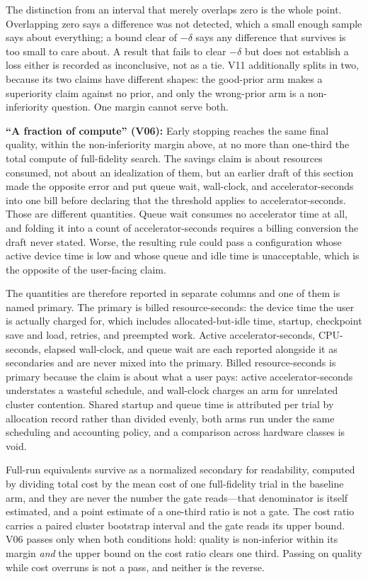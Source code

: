 The distinction from an interval that merely overlaps zero is the whole
point. Overlapping zero says a difference was not detected, which a
small enough sample says about everything; a bound clear of $-\delta$
says any difference that survives is too small to care about. A result
that fails to clear $-\delta$ but does not establish a loss either is
recorded as inconclusive, not as a tie. V11 additionally splits in two,
because its two claims have different shapes: the good-prior arm makes
a superiority claim against no prior, and only the wrong-prior arm is a
non-inferiority question. One margin cannot serve both.

\textbf{``A fraction of compute'' (V06):} Early stopping reaches the
same final quality, within the non-inferiority margin above, at no
more than one-third the total compute of full-fidelity search.
The savings claim is about resources consumed, not about an
idealization of them, but an earlier draft of this section made the
opposite error and put queue wait, wall-clock, and accelerator-seconds
into one bill before declaring that the threshold applies to
accelerator-seconds. Those are different quantities. Queue wait
consumes no accelerator time at all, and folding it into a count of
accelerator-seconds requires a billing conversion the draft never
stated. Worse, the resulting rule could pass a configuration whose
active device time is low and whose queue and idle time is
unacceptable, which is the opposite of the user-facing claim.

The quantities are therefore reported in separate columns and one of
them is named primary. The primary is billed resource-seconds: the
device time the user is actually charged for, which includes
allocated-but-idle time, startup, checkpoint save and load, retries,
and preempted work. Active accelerator-seconds, CPU-seconds, elapsed
wall-clock, and queue wait are each reported alongside it as
secondaries and are never mixed into the primary. Billed
resource-seconds is primary because the claim is about what a user
pays: active accelerator-seconds understates a wasteful schedule, and
wall-clock charges an arm for unrelated cluster contention. Shared
startup and queue time is attributed per trial by allocation record
rather than divided evenly, both arms run under the same scheduling and
accounting policy, and a comparison across hardware classes is void.

Full-run equivalents survive as a normalized secondary for readability,
computed by dividing total cost by the mean cost of one full-fidelity
trial in the baseline arm, and they are never the number the gate
reads—that denominator is itself estimated, and a point estimate of a
one-third ratio is not a gate. The cost ratio carries a paired cluster
bootstrap interval and the gate reads its upper bound. V06 passes only
when both conditions hold: quality is non-inferior within its margin
\emph{and} the upper bound on the cost ratio clears one third. Passing
on quality while cost overruns is not a pass, and neither is the
reverse.

